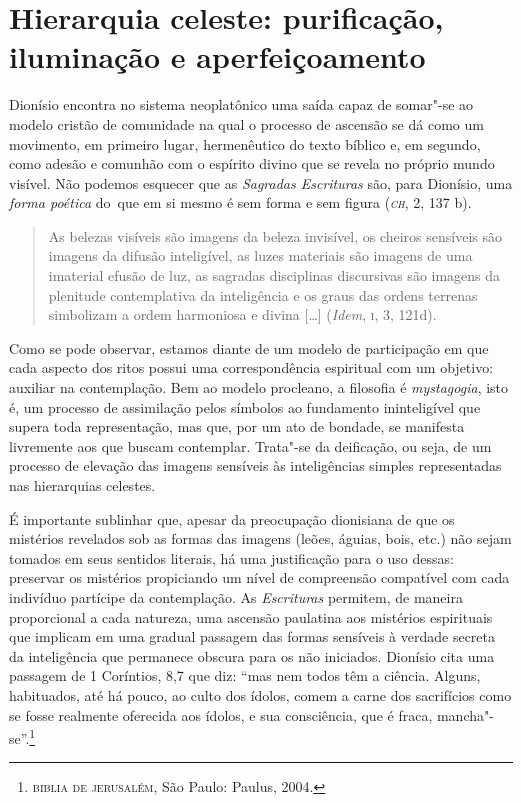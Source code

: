 {\section{Hierarquia celeste: purificação, iluminação e aperfeiçoamento}

Dionísio encontra no sistema neoplatônico uma saída capaz de somar"-se ao
modelo cristão de comunidade na qual o processo de ascensão se dá como
um movimento, em primeiro lugar, hermenêutico do texto bíblico e,  em
segundo, como adesão e comunhão com o espírito divino que se revela no
próprio mundo visível.  Não podemos esquecer que as \emph{Sagradas
Escrituras} são, para Dionísio, uma \emph{forma poética} \mbox{do que} em si
mesmo é sem forma e sem figura (\emph{\textsc{ch}}, 2, 137 b).

\begin{quote} 
As belezas visíveis são imagens da beleza invisível, os cheiros
sensíveis são imagens da difusão inteligível, as luzes materiais são
imagens de uma imaterial efusão de luz, as sagradas disciplinas
discursivas são imagens da plenitude contemplativa da inteligência e os
graus das ordens terrenas simbolizam a ordem harmoniosa e divina [\ldots{}]
(\emph{Idem}, \textsc{i}, 3, 121d).
\end{quote} 

Como se pode observar, estamos diante de um modelo de participação em
que cada aspecto dos ritos possui uma correspondência espiritual com um
objetivo: auxiliar na contemplação. Bem ao modelo procleano, a
filosofia é \emph{mystagogia}, isto é, um processo de assimilação
pelos símbolos ao fundamento ininteligível que supera toda
representação, mas que, por um ato de bondade, se manifesta livremente
aos que buscam contemplar. Trata"-se da deificação, ou seja, de um
processo de elevação das imagens sensíveis às inteligências simples
representadas nas hierarquias celestes.

É importante sublinhar que, apesar da preocupação dionisiana de que os
mistérios revelados sob as formas das imagens (leões, águias, bois,
etc.) não sejam tomados em seus sentidos literais, há uma justificação
para o uso dessas: preservar os mistérios propiciando um nível de
compreensão compatível com cada indivíduo partícipe da contemplação. As
\emph{Escrituras} permitem, de maneira proporcional a cada natureza,
uma ascensão paulatina aos mistérios espirituais que implicam em uma
gradual passagem das formas sensíveis à verdade secreta da inteligência
que permanece obscura para os não iniciados. Dionísio cita uma passagem
de 1 Coríntios, 8,7 que diz:  ``mas nem todos têm a
ciência. Alguns, habituados, até há pouco, ao culto dos ídolos, comem a
carne dos sacrifícios como se fosse realmente oferecida aos ídolos, e
sua consciência, que é fraca, mancha"-se''.\footnote{ \textsc{biblia de
jerusalém}, São Paulo: Paulus, 2004.}

}
